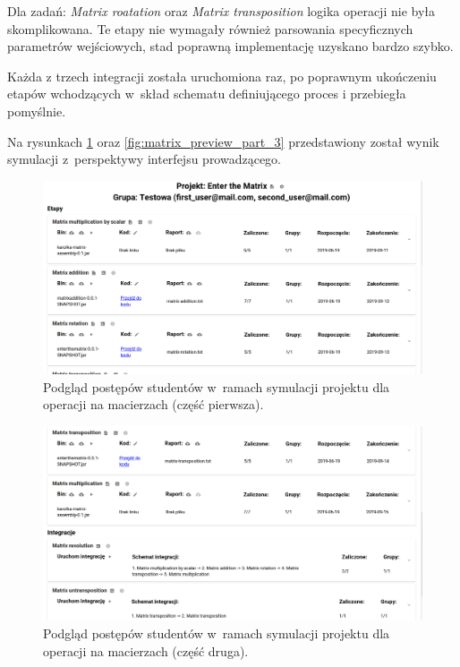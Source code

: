 Dla zadań: \textit{Matrix roatation} oraz \textit{Matrix transposition} logika operacji nie była skomplikowana.
Te etapy nie wymagały również parsowania specyficznych parametrów wejściowych, stad poprawną implementację uzyskano bardzo szybko.

Każda z trzech integracji została uruchomiona raz, po poprawnym ukończeniu etapów wchodzących w~skład schematu definiującego proces i przebiegła pomyślnie.

Na rysunkach \ref{fig:matrix_preview_part_1} oraz \ref{fig:matrix_preview_part_3} przedstawiony został wynik symulacji z~perspektywy interfejsu prowadzącego.

\begin{figure}[H]
    \centering
    \includegraphics[width = 16cm]{chapter07/matrix_preview_part_1.png}
    \caption{Podgląd postępów studentów w~ramach symulacji projektu dla operacji na macierzach (część pierwsza).}
    \label{fig:matrix_preview_part_1}
\end{figure}

\begin{figure}[H]
    \centering
    \includegraphics[width = 16cm]{chapter07/matrix_preview_part_2.png}
    \caption{Podgląd postępów studentów w~ramach symulacji projektu dla operacji na macierzach (część druga).}
    \label{fig:matrix_preview_part_2}
\end{figure}


